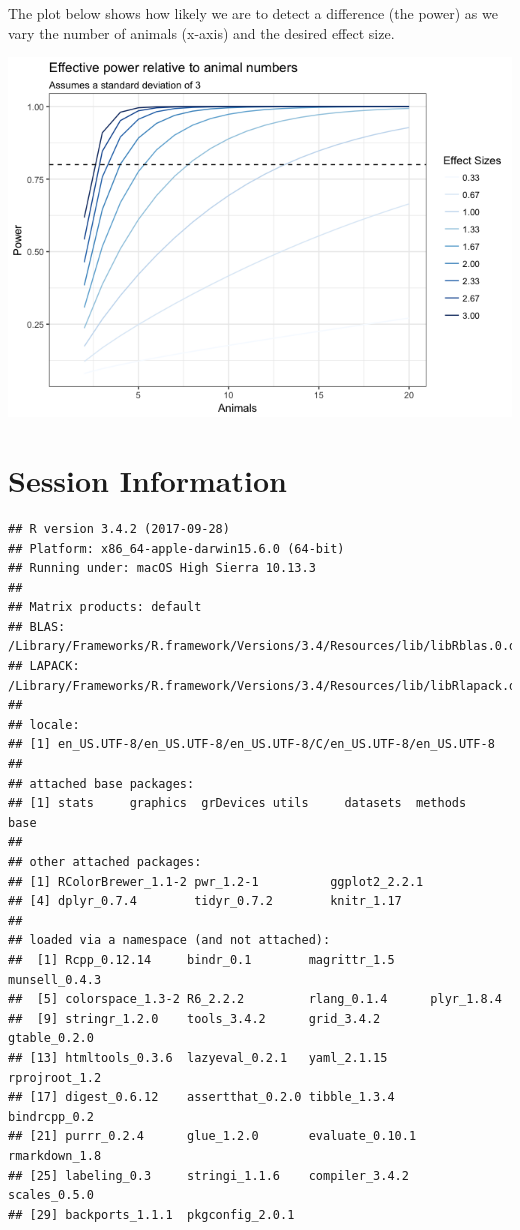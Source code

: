 \documentclass[]{article}
\begin{document}
The plot below shows how likely we are to detect a difference (the
power) as we vary the number of animals (x-axis) and the desired effect
size.

\includegraphics{figures/effect-size-plot-1.png}

\section{Session Information}\label{session-information}

\begin{verbatim}
## R version 3.4.2 (2017-09-28)
## Platform: x86_64-apple-darwin15.6.0 (64-bit)
## Running under: macOS High Sierra 10.13.3
## 
## Matrix products: default
## BLAS: /Library/Frameworks/R.framework/Versions/3.4/Resources/lib/libRblas.0.dylib
## LAPACK: /Library/Frameworks/R.framework/Versions/3.4/Resources/lib/libRlapack.dylib
## 
## locale:
## [1] en_US.UTF-8/en_US.UTF-8/en_US.UTF-8/C/en_US.UTF-8/en_US.UTF-8
## 
## attached base packages:
## [1] stats     graphics  grDevices utils     datasets  methods   base     
## 
## other attached packages:
## [1] RColorBrewer_1.1-2 pwr_1.2-1          ggplot2_2.2.1     
## [4] dplyr_0.7.4        tidyr_0.7.2        knitr_1.17        
## 
## loaded via a namespace (and not attached):
##  [1] Rcpp_0.12.14     bindr_0.1        magrittr_1.5     munsell_0.4.3   
##  [5] colorspace_1.3-2 R6_2.2.2         rlang_0.1.4      plyr_1.8.4      
##  [9] stringr_1.2.0    tools_3.4.2      grid_3.4.2       gtable_0.2.0    
## [13] htmltools_0.3.6  lazyeval_0.2.1   yaml_2.1.15      rprojroot_1.2   
## [17] digest_0.6.12    assertthat_0.2.0 tibble_1.3.4     bindrcpp_0.2    
## [21] purrr_0.2.4      glue_1.2.0       evaluate_0.10.1  rmarkdown_1.8   
## [25] labeling_0.3     stringi_1.1.6    compiler_3.4.2   scales_0.5.0    
## [29] backports_1.1.1  pkgconfig_2.0.1
\end{verbatim}
\end{document}
